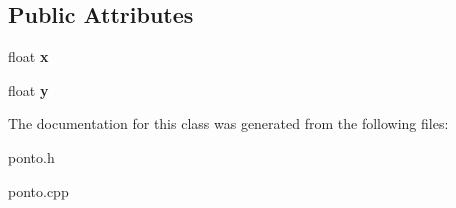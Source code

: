 \subsection*{Public Attributes}
\begin{DoxyCompactItemize}
\item 
\mbox{\label{classponto_a5ab2f6400e904f54dabfffe45b3001df}} 
float {\bfseries x}
\item 
\mbox{\label{classponto_a6c2bb55c1dabf042c072426759d33f40}} 
float {\bfseries y}
\end{DoxyCompactItemize}


The documentation for this class was generated from the following files\+:\begin{DoxyCompactItemize}
\item 
ponto.\+h\item 
ponto.\+cpp\end{DoxyCompactItemize}
